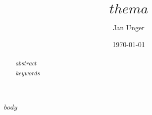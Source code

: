 \documentclass{content/vorlage-design-main}
\title{$thema$}
\author{Jan Unger}
\date{\today}
\begin{document}
\maketitle

\begin{abstract}
$abstract$

$keywords$
\end{abstract}

$body$


\clearpage
\printbibliography
\end{document}
